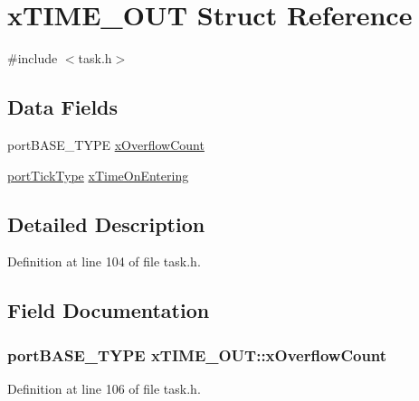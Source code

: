 \hypertarget{structx_t_i_m_e___o_u_t}{\section{x\-T\-I\-M\-E\-\_\-\-O\-U\-T Struct Reference}
\label{structx_t_i_m_e___o_u_t}
}


{\ttfamily \#include $<$task.\-h$>$}

\subsection*{Data Fields}
\begin{DoxyCompactItemize}
\item 
port\-B\-A\-S\-E\-\_\-\-T\-Y\-P\-E \hyperlink{structx_t_i_m_e___o_u_t_ac04daff481f3ee5f08228b09a83a678b}{x\-Overflow\-Count}
\item 
\hyperlink{_s_t_m32_f10x_2_libraries_2_free_r_t_o_s_2_source_2portable_2_g_c_c_2_a_r_m___c_m3_2portmacro_8h_a4d746b2ff8fafc490b764c66411ec457}{port\-Tick\-Type} \hyperlink{structx_t_i_m_e___o_u_t_a8342bf2057b33c50205da6a19d9caa1c}{x\-Time\-On\-Entering}
\end{DoxyCompactItemize}


\subsection{Detailed Description}


Definition at line 104 of file task.\-h.



\subsection{Field Documentation}
\hypertarget{structx_t_i_m_e___o_u_t_ac04daff481f3ee5f08228b09a83a678b}{
\subsubsection[{x\-Overflow\-Count}]{\setlength{\rightskip}{0pt plus 5cm}port\-B\-A\-S\-E\-\_\-\-T\-Y\-P\-E x\-T\-I\-M\-E\-\_\-\-O\-U\-T\-::x\-Overflow\-Count}}\label{structx_t_i_m_e___o_u_t_ac04daff481f3ee5f08228b09a83a678b}


Definition at line 106 of file task.\-h.

